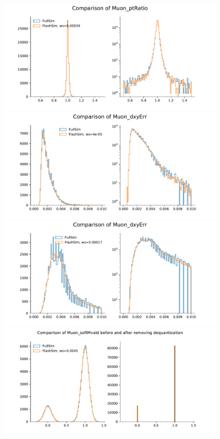 \begin{figure}
    \myfloatalign
    \includegraphics[width=\linewidth]{gfx/ch5/meval2.pdf} \\
    \includegraphics[width=\linewidth]{gfx/ch5/meval4.pdf} \\
    \includegraphics[width=\linewidth]{gfx/ch5/meval6.pdf} \\
    \includegraphics[width=\linewidth]{gfx/ch5/meval21.pdf}

\end{figure}
